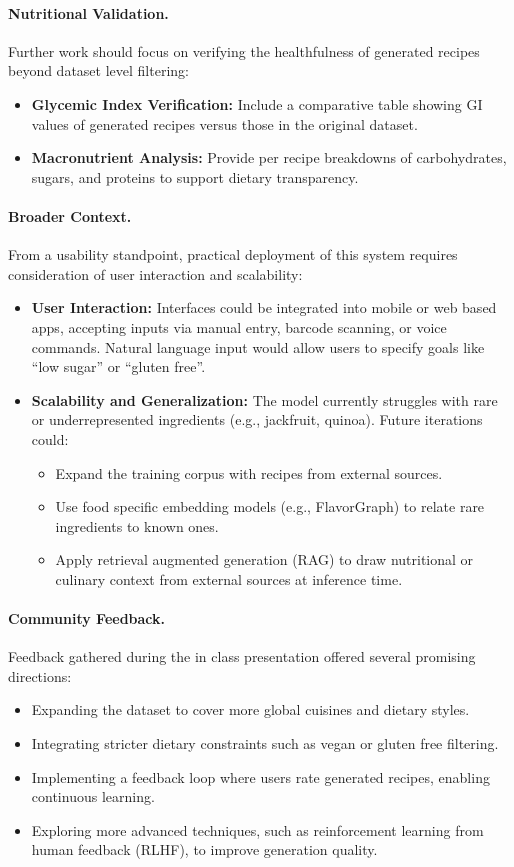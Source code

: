 \paragraph{Nutritional Validation.}
Further work should focus on verifying the healthfulness of generated recipes beyond dataset level filtering:
\begin{itemize}
    \item \textbf{Glycemic Index Verification:} Include a comparative table showing GI values of generated recipes versus those in the original dataset.
    \item \textbf{Macronutrient Analysis:} Provide per recipe breakdowns of carbohydrates, sugars, and proteins to support dietary transparency.
\end{itemize}

\paragraph{Broader Context.}
From a usability standpoint, practical deployment of this system requires consideration of user interaction and scalability:
\begin{itemize}
    \item \textbf{User Interaction:} Interfaces could be integrated into mobile or web based apps, accepting inputs via manual entry, barcode scanning, or voice commands. Natural language input would allow users to specify goals like ``low sugar'' or ``gluten free''.
    \item \textbf{Scalability and Generalization:} The model currently struggles with rare or underrepresented ingredients (e.g., jackfruit, quinoa). Future iterations could:
    \begin{itemize}
        \item Expand the training corpus with recipes from external sources.
        \item Use food specific embedding models (e.g., FlavorGraph) to relate rare ingredients to known ones.
        \item Apply retrieval augmented generation (RAG) to draw nutritional or culinary context from external sources at inference time.
    \end{itemize}
\end{itemize}

\paragraph{Community Feedback.}
Feedback gathered during the in class presentation offered several promising directions:
\begin{itemize}
    \item Expanding the dataset to cover more global cuisines and dietary styles.
    \item Integrating stricter dietary constraints such as vegan or gluten free filtering.
    \item Implementing a feedback loop where users rate generated recipes, enabling continuous learning.
    \item Exploring more advanced techniques, such as reinforcement learning from human feedback (RLHF), to improve generation quality.
\end{itemize}

